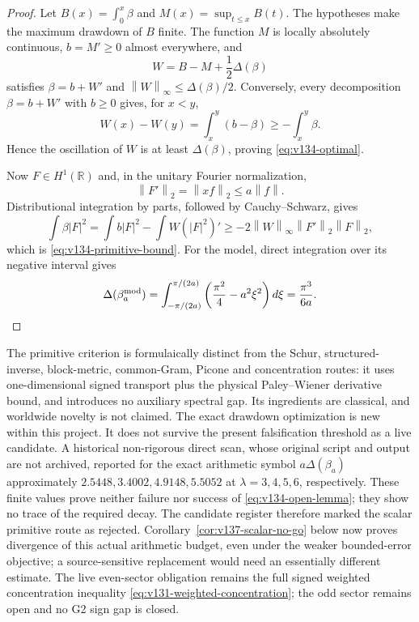 \documentclass[11pt]{article}
\theoremstyle{remark}
\newcommand{\norm}[1]{\left\lVert #1\right\rVert}
\begin{document}
\begin{proof}
Let $B(x)=\int_0^x\beta$ and
$M(x)=\sup_{t\le x}B(t)$.  The hypotheses make the maximum drawdown of
$B$ finite.  The function $M$ is locally absolutely continuous,
$b=M'\ge0$ almost everywhere, and
\[
 W=B-M+\frac12\Delta(\beta)
\]
satisfies $\beta=b+W'$ and
$\norm W_\infty\le\Delta(\beta)/2$.  Conversely, every decomposition
$\beta=b+W'$ with $b\ge0$ gives, for $x<y$,
\[
 W(x)-W(y)=\int_x^y(b-\beta)
 \ge-\int_x^y\beta.
\]
Hence the oscillation of $W$ is at least $\Delta(\beta)$, proving
\eqref{eq:v134-optimal}.

Now $F\in H^1(\mathbb R)$ and, in the unitary Fourier normalization,
\[
 \norm{F'}_2=\norm{xf}_2\le a\norm f.
\]
Distributional integration by parts, followed by Cauchy--Schwarz,
gives
\[
 \int\beta|F|^2
 =\int b|F|^2-\int W(|F|^2)'
 \ge-2\norm W_\infty\norm{F'}_2\norm F_2,
\]
which is \eqref{eq:v134-primitive-bound}.  For the model, direct
integration over its negative interval gives
\[
 \Delta(\beta_a^{\rm mod})
 =\int_{-\pi/(2a)}^{\pi/(2a)}
   \left(\frac{\pi^2}{4}-a^2\xi^2\right)d\xi
 =\frac{\pi^3}{6a}.
\]
\end{proof}

The primitive criterion is formulaically distinct from the Schur,
structured-inverse, block-metric, common-Gram, Picone and concentration
routes: it uses one-dimensional signed transport plus the physical
Paley--Wiener derivative bound, and introduces no auxiliary spectral
gap.  Its ingredients are classical, and worldwide novelty is not
claimed.  The exact drawdown optimization is new within this project.
It does not survive the present falsification threshold as a live
candidate. A historical non-rigorous direct scan, whose original script
and output are not archived, reported for the exact arithmetic symbol $a\Delta(\beta_a)$ approximately $2.5448,3.4002,4.9148,5.5052$
at $\lambda=3,4,5,6$, respectively.  These finite values prove neither
failure nor success of \eqref{eq:v134-open-lemma}; they show no trace of
the required decay.  The candidate register therefore marked the scalar
primitive route as rejected. Corollary~\ref{cor:v137-scalar-no-go}
below now proves divergence of this actual arithmetic budget, even
under the weaker bounded-error objective; a source-sensitive replacement
would need an essentially different estimate.  The live even-sector obligation remains the full
signed weighted concentration inequality
\eqref{eq:v131-weighted-concentration}; the odd sector remains open and
no G2 sign gap is closed.
\end{document}
